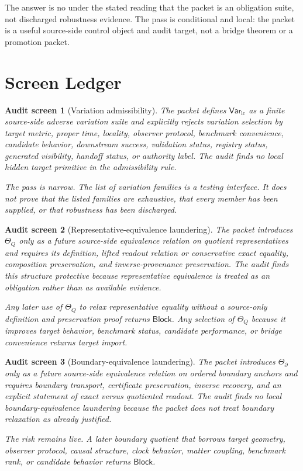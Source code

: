 \documentclass[11pt]{article}
\newcommand{\VarLC}{\mathsf{Var}_{\mathrm{lc}}}
\newcommand{\Block}{\mathsf{Block}}
\newtheorem{screen}{Audit screen}
\begin{document}
The answer is no under the stated reading that the packet is an
obligation suite, not discharged robustness evidence. The pass is
conditional and local: the packet is a useful source-side control
object and audit target, not a bridge theorem or a promotion packet.

\section{Screen Ledger}

\begin{screen}[Variation admissibility]
The packet defines \(\VarLC\) as a finite source-side adverse variation
suite and explicitly rejects variation selection by target metric,
proper time, locality, observer protocol, benchmark convenience,
candidate behavior, downstream success, validation status, registry
status, generated visibility, handoff status, or authority label. The
audit finds no local hidden target primitive in the admissibility rule.

The pass is narrow. The list of variation families is a testing
interface. It does not prove that the listed families are exhaustive,
that every member has been supplied, or that robustness has been
discharged.
\end{screen}

\begin{screen}[Representative-equivalence laundering]
The packet introduces \(\Theta_Q\) only as a future source-side
equivalence relation on quotient representatives and requires its
definition, lifted readout relation or conservative exact equality,
composition preservation, and inverse-provenance preservation. The
audit finds this structure protective because representative
equivalence is treated as an obligation rather than as available
evidence.

Any later use of \(\Theta_Q\) to relax representative equality without
a source-only definition and preservation proof returns \(\Block\).
Any selection of \(\Theta_Q\) because it improves target behavior,
benchmark status, candidate performance, or bridge convenience returns
target import.
\end{screen}

\begin{screen}[Boundary-equivalence laundering]
The packet introduces \(\Theta_{\partial}\) only as a future
source-side equivalence relation on ordered boundary anchors and
requires boundary transport, certificate preservation, inverse
recovery, and an explicit statement of exact versus quotiented readout.
The audit finds no local boundary-equivalence laundering because the
packet does not treat boundary relaxation as already justified.

The risk remains live. A later boundary quotient that borrows target
geometry, observer protocol, causal structure, clock behavior, matter
coupling, benchmark rank, or candidate behavior returns \(\Block\).
\end{screen}
\end{document}
